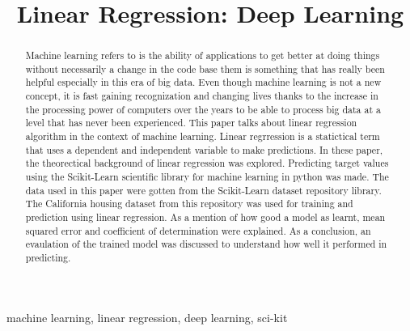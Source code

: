 \documentclass[conference]{IEEEtran}
\begin{document}
\title{Linear Regression: Deep Learning}

\author{
}

\maketitle

\begin{abstract}
Machine learning refers to is the ability of applications to get better at doing things without necessarily a change in the code base them is something that has really been helpful especially in this era of big data.
Even though machine learning is not a new concept, it is fast gaining recognization and changing lives thanks to the increase in the processing power of computers over the years to be able to process big data at a level that has never been experienced. This paper talks about linear regression algorithm in the context of machine learning. Linear regrression is a statictical term that uses a dependent and independent variable to make predictions. In these paper, the theorectical background of linear regression was explored. Predicting target values using the Scikit-Learn scientific library for machine learning  in python was made. The data used in this paper were gotten from the Scikit-Learn dataset repository library. The California housing dataset from this repository was used for training and prediction using linear regression. As a mention of how good a model as learnt, mean squared error and coefficient of determination were explained. As a conclusion, an evaulation of the trained model was discussed to understand how well it performed in predicting.
\end{abstract}
\begin{IEEEkeywords}
machine learning, linear regression, deep learning, sci-kit
\end{IEEEkeywords}
\end{document}
